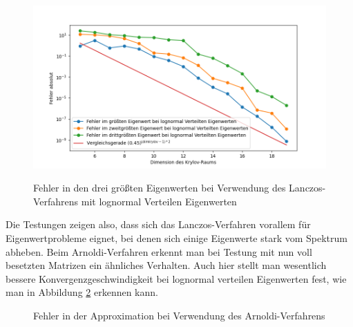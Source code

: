 \documentclass{article}
\theoremstyle{plain}
\begin{document}
\begin{figure}[H]
\begin{center}
	\includegraphics[width = 0.7 \linewidth]{Plots/lanczos_lognormal}\label{lanczos_lognomal}
	\caption{Fehler in den drei größten Eigenwerten bei Verwendung des Lanczos-Verfahrens mit lognormal Verteilen Eigenwerten}
	\end{center}
\end{figure}


Die Testungen zeigen also, dass sich das Lanczos-Verfahren vorallem für Eigenwertprobleme eignet, bei denen sich einige Eigenwerte stark vom Spektrum abheben. Beim Arnoldi-Verfahren erkennt man bei Testung mit nun voll besetzten Matrizen ein ähnliches Verhalten. Auch hier stellt man wesentlich bessere Konvergenzgeschwindigkeit bei lognormal verteilen Eigenwerten fest, wie man in Abbildung \ref{Arnoldi_error} erkennen kann.

\begin{figure}[H]
  \centering
  \qquad
  \caption{Fehler in der Approximation bei Verwendung des Arnoldi-Verfahrens}%
  \label{Arnoldi_error}
\end{figure}
\end{document}
